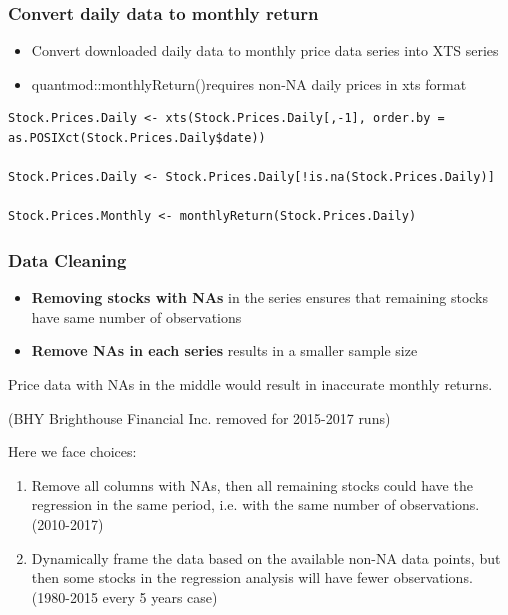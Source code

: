 \documentclass{beamer}
\begin{document}
\begin{frame}[fragile]
\frametitle{Convert daily data to monthly return}
\begin{itemize}
\item Convert downloaded daily data to monthly price data series into XTS series
\item quantmod::monthlyReturn()requires non-NA daily prices in xts format
\end{itemize}
\begin{lstlisting}
Stock.Prices.Daily <- xts(Stock.Prices.Daily[,-1], order.by = as.POSIXct(Stock.Prices.Daily$date))

Stock.Prices.Daily <- Stock.Prices.Daily[!is.na(Stock.Prices.Daily)]

Stock.Prices.Monthly <- monthlyReturn(Stock.Prices.Daily)
\end{lstlisting}

\end{frame}

\begin{frame}
\frametitle{Data Cleaning}
\begin{itemize}
\item \textbf{Removing stocks with NAs} in the series ensures that remaining stocks have same number of observations
\item \textbf{Remove NAs in each series} results in a smaller sample size 
\end{itemize}

Price data with NAs in the middle would result in inaccurate monthly returns. 

\begin{tiny}(BHY Brighthouse Financial Inc. removed for 2015-2017 runs)
\end{tiny}

Here we face choices: 
\begin{enumerate}
\item Remove all columns with NAs, then all remaining stocks could have the regression in the same period, i.e. with the same number of observations. (2010-2017) 

\item Dynamically frame the data based on the available non-NA data points, but then some stocks in the regression analysis will have fewer observations. (1980-2015 every 5 years case) 
\end{enumerate}

\end{frame}
\end{document}
